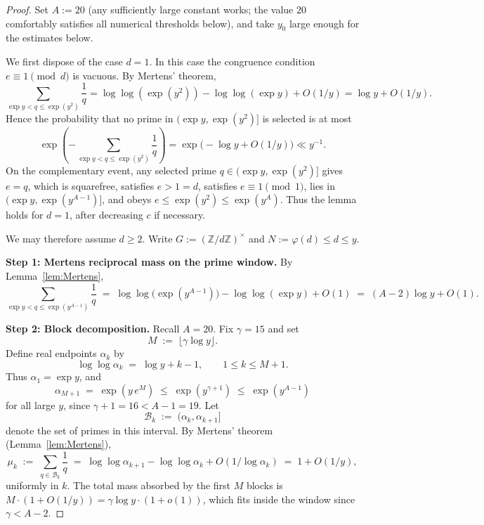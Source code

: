 \documentclass[11pt,reqno]{amsart}
\theoremstyle{plain}
\theoremstyle{definition}
\newcommand{\ZZ}{\mathbb{Z}}
\begin{document}
\begin{proof}
Set $A:=20$ (any sufficiently large constant works; the value $20$ comfortably
satisfies all numerical thresholds below), and take $y_0$ large enough for the
estimates below.

We first dispose of the case $d=1$. In this case the congruence condition
$e\equiv 1\pmod d$ is vacuous. By Mertens' theorem,
\[
\sum_{\exp y<q\le \exp(y^2)}\frac1q
=
\log\log(\exp(y^2))-\log\log(\exp y)+O(1/y)
=
\log y+O(1/y).
\]
Hence the probability that no prime in $(\exp y,\exp(y^2)]$ is selected is at
most
\[
\exp\!\left(-\sum_{\exp y<q\le \exp(y^2)}\frac1q\right)
=
\exp\bigl(-\log y+O(1/y)\bigr)
\ll y^{-1}.
\]
On the complementary event, any selected prime $q\in(\exp y,\exp(y^2)]$ gives
$e=q$, which is squarefree, satisfies $e>1=d$, satisfies $e\equiv 1\pmod 1$,
lies in $\bigl(\exp y,\exp(y^{A-1})\bigr]$, and obeys
$e\le \exp(y^2)\le \exp(y^A)$. Thus the lemma holds for $d=1$, after decreasing
$c$ if necessary.

We may therefore assume $d\ge 2$. Write $G:=(\ZZ/d\ZZ)^\times$ and
$N:=\varphi(d)\le d\le y$.

\medskip\noindent
\textbf{Step 1: Mertens reciprocal mass on the prime window.} By
Lemma~\ref{lem:Mertens},
\begin{equation}\label{eq:Mertens-window}
\sum_{\exp y<q\le \exp(y^{A-1})}\frac{1}{q}
\;=\; \log\log\bigl(\exp(y^{A-1})\bigr)-\log\log(\exp y)+O(1)
\;=\; (A-2)\log y + O(1).
\end{equation}

\medskip\noindent
\textbf{Step 2: Block decomposition.}
Recall $A=20$. Fix $\gamma=15$ and set
\begin{equation}\label{eq:M-blocks}
M \;:=\; \lfloor\gamma\log y\rfloor.
\end{equation}
Define real endpoints $\alpha_k$ by
\[
\log\log \alpha_k \;=\; \log y+k-1, \qquad 1\le k\le M+1.
\]
Thus $\alpha_1=\exp y$, and
\[
\alpha_{M+1}
\;=\;
\exp\!\left(y\,e^M\right)
\;\le\;
\exp\!\left(y^{\gamma+1}\right)
\;\le\;
\exp(y^{A-1})
\]
for all large $y$, since $\gamma+1=16<A-1=19$. Let
\[
\mathcal B_k \;:=\; \bigl(\alpha_k,\alpha_{k+1}\bigr]
\]
denote the set of primes in this interval. By Mertens' theorem
(Lemma~\ref{lem:Mertens}),
\begin{equation}\label{eq:block-mass}
\mu_k \;:=\; \sum_{q\in\mathcal B_k}\frac1q
\;=\;
\log\log\alpha_{k+1}-\log\log\alpha_k+O(1/\log\alpha_k)
\;=\;
1+O(1/y),
\end{equation}
uniformly in $k$. The total mass absorbed by the first $M$ blocks is
$M\cdot(1+O(1/y))=\gamma\log y\cdot(1+o(1))$, which fits inside the window
since $\gamma<A-2$.


\end{proof}
\end{document}
